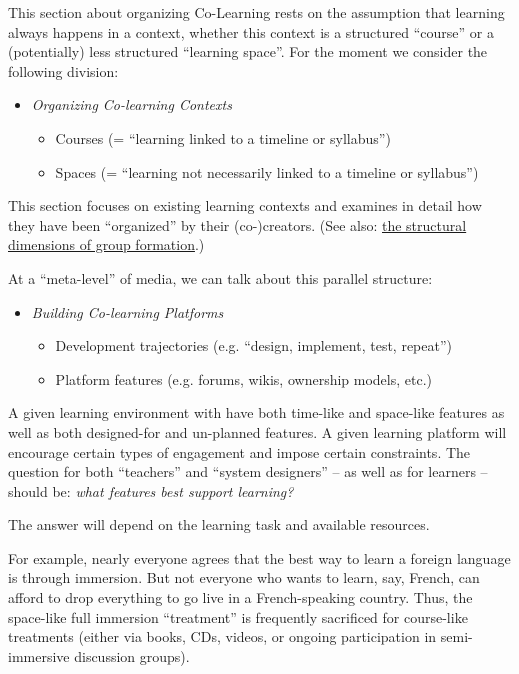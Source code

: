 This section about organizing Co-Learning rests on the assumption that
learning always happens in a context, whether this context is a
structured ``course'' or a (potentially) less structured ``learning
space''. For the moment we consider the following division:

\begin{itemize}
\item
  \emph{Organizing Co-learning Contexts}
  \begin{itemize}
  \item
    Courses (= ``learning linked to a timeline or syllabus'')
  \item
    Spaces (= ``learning not necessarily linked to a timeline or
    syllabus'')
  \end{itemize}
\end{itemize}
This section focuses on existing learning contexts and examines in
detail how they have been ``organized'' by their (co-)creators. (See
also:
\href{http://socialmediaclassroom.com/host/peeragogy/wiki/structural-dimensions-the-what-we-are-learning-vs-time-and-types-structures}{the
structural dimensions of group formation}.)

At a ``meta-level'' of media, we can talk about this parallel structure:

\begin{itemize}
\item
  \emph{Building Co-learning Platforms}
  \begin{itemize}
  \item
    Development trajectories (e.g. ``design, implement, test, repeat'')
  \item
    Platform features (e.g. forums, wikis, ownership models, etc.)
  \end{itemize}
\end{itemize}
A given learning environment with have both time-like and space-like
features as well as both designed-for and un-planned features. A given
learning platform will encourage certain types of engagement and impose
certain constraints. The question for both ``teachers'' and ``system
designers'' -- as well as for learners -- should be: \emph{what features
best support learning?}

The answer will depend on the learning task and available resources.

For example, nearly everyone agrees that the best way to learn a foreign
language is through immersion. But not everyone who wants to learn, say,
French, can afford to drop everything to go live in a French-speaking
country. Thus, the space-like full immersion ``treatment'' is frequently
sacrificed for course-like treatments (either via books, CDs, videos, or
ongoing participation in semi-immersive discussion groups).

